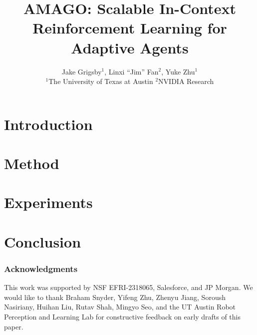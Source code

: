 \documentclass{article}
\title{AMAGO: Scalable In-Context Reinforcement Learning for Adaptive Agents}
\author{
Jake Grigsby$^{1}$, Linxi ``Jim'' Fan$^{2}$, Yuke Zhu$^{1}$\\
$^1$The University of Texas at Austin \quad
$^2$NVIDIA Research\\
}
\begin{document}
\maketitle

\begin{abstract}

\end{abstract}

\section{Introduction}





\vspace{-2mm}
\section{Method}



\section{Experiments}


\vspace{-3mm}
\section{Conclusion}



\subsubsection*{Acknowledgments}
This work was supported by NSF EFRI-2318065, Salesforce, and JP Morgan. We would like to thank Braham Snyder, Yifeng Zhu, Zhenyu Jiang, Soroush Nasiriany, Huihan Liu, Rutav Shah, Mingyo Seo, and the UT Austin Robot Perception and Learning Lab for constructive feedback on early drafts of this paper.

\printbibliography

\appendix


\end{document}
